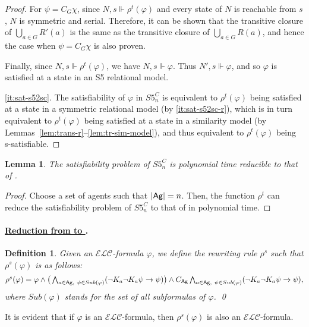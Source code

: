 \documentclass{article}
\newtheorem{definition}[theorem]{Definition}%
\newtheorem{lemma}[theorem]{Lemma}%
\newcommand{\ag}{\text{\normalfont\textsf{Ag}}\xspace}
\renewcommand{\phi}{\varphi}
\newcommand{\ra}{\rightarrow}
\newcommand{\langc}{\ensuremath{\mathcal{ELC}}\xspace}
\newcommand{\lc}{\text{\normalfont ELC}\xspace}
\newcommand{\lsc}{\text{\normalfont ELC$^s$}\xspace}
\begin{document}
\begin{proof}
For $\psi = C_G \chi$, since $N,s\Vdash \rho^t(\phi)$ and every state of $N$ is reachable from $s$, $N$ is symmetric and serial. Therefore, it can be shown that the transitive closure of $\bigcup_{a\in G}R'(a)$ is the same as the transitive closure of $\bigcup_{a\in G}R(a)$, and hence the case when $\psi = C_G\chi$ is also proven.

Finally, since $N,s\Vdash\rho^t(\phi)$, we have $N,s\Vdash\phi$. Thus $N',s\Vdash\phi$, and so $\phi$ is satisfied at a state in an S5 relational model.

\ref{it:sat-s52sc}. The satisfiability of $\phi$ in $S5^C_n$ is equivalent to $\rho^t(\phi)$ being satisfied at a state in a symmetric relational model (by \ref{it:sat-s52sc-r}), which is in turn equivalent to $\rho^t(\phi)$ being satisfied at a state in a similarity model (by Lemmas~\ref{lem:trans-r}--\ref{lem:tr-sim-model}), and thus equivalent to $\rho^t(\phi)$ being s-satisfiable.
\end{proof}

\begin{lemma}\label{lem:red-s52sc}
The satisfiability problem of $S5^C_n$ is polynomial time reducible to that of \lsc.
\end{lemma}
\begin{proof}
Choose a set \ag of agents such that $|\ag|=n$. Then, the function $\rho^t$ can reduce the satisfiability problem of $S5^C_n$ to that of \lsc in polynomial time.
\end{proof}

\paragraph{\bfseries\underline{Reduction from \lsc to \lc}.}

\begin{definition}\label{def:rewrite-s}
Given an $\langc$-formula $\phi$, we define the rewriting rule $\rho^s$ such that $\rho^s(\phi)$ is as follows:
$$\textstyle \rho^s(\phi)=\phi \wedge \big(\bigwedge_{a\in\ag,\ \psi\in Sub(\phi)} (\neg K_a \neg K_a\psi \ra \psi) \big) \wedge C_{\ag} \bigwedge_{a\in\ag,\ \psi\in Sub(\phi)}(\neg K_a \neg K_a\psi \ra \psi),$$
where $Sub(\phi)$ stands for the set of all subformulas of $\phi$.
\qed
\end{definition}
It is evident that if $\phi$ is an \langc-formula, then $\rho^s(\phi)$ is also an \langc-formula.
\end{document}
